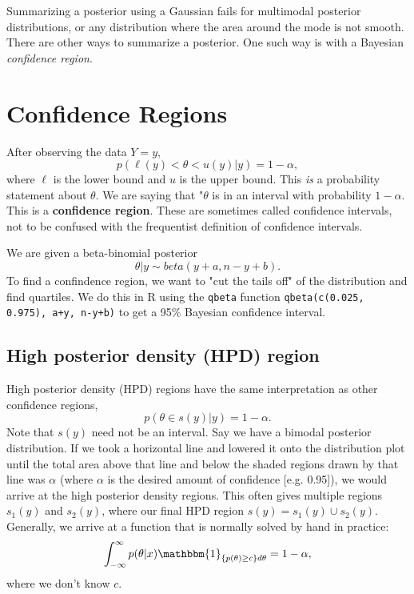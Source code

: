 \documentclass[titlepage, 12pt, leqno]{article}
\begin{document}
Summarizing a posterior using a Gaussian fails for multimodal posterior 
distributions, or any distribution where the area around the mode is not smooth.
There are other ways to summarize a posterior. One such way is with a Bayesian
\textit{confidence region}.

\pagebreak
\section{Confidence Regions}

\begin{definition}
After observing the data $Y=y$, 
\[
    p\left(\ell(y) < \theta < u(y) | y\right) = 1 - \alpha,
\]
where $\ell$ is the lower bound and $u$ is the upper bound. This \textit{is} a
probability statement about $\theta$. We are saying that "$\theta$ is in an
interval with probability $1-\alpha$. This is a \textbf{confidence region}. These
are sometimes called confidence intervals, not to be confused with the frequentist
definition of confidence intervals.
\end{definition}

\begin{ex}
    We are given a beta-binomial posterior
    \[
    \theta|y \sim beta(y+a, n-y+b).
    \]
    To find a confindence region, we want to "cut the tails off" of the 
    distribution and find quartiles. We do this in R using the \texttt{qbeta} 
    function \texttt{qbeta(c(0.025, 0.975), a+y, n-y+b)} to get a 95\% 
    Bayesian confidence interval.
\end{ex}

\subsection{High posterior density (HPD) region}

High posterior density (HPD) regions have the same interpretation as other
confidence regions,
\[
    p(\theta \in  s(y)|y) = 1-\alpha.
\]
Note that $s(y)$ need not be an interval. Say we have a bimodal posterior
distribution. If we took a horizontal line and lowered it onto the distribution
plot until the total area above that line and below the shaded regions drawn
by that line was $\alpha$ (where $\alpha$ is the desired amount of
confidence [e.g. 0.95]), we would arrive at the high posterior density regions.
This often gives multiple regions $s_{1}(y)$ and $s_{2}(y)$, where our final 
HPD region $s(y) = s_{1}(y) \cup s_{2}(y)$. Generally, we arrive at a function
that is normally solved by hand in practice:
\[
    \int_{-\infty}^{\infty}p(\theta|x) \mathbbm{1}_{\{p(\theta) \ge c\}d \theta} 
    = 1-\alpha,
\]
where we don't know $c$.
\end{document}
